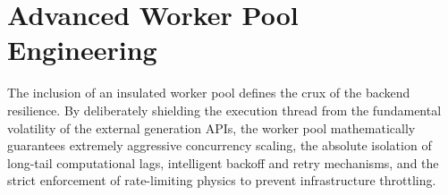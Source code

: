 \section{Advanced Worker Pool Engineering}
The inclusion of an insulated worker pool defines the crux of the backend resilience. By deliberately shielding the execution thread from the fundamental volatility of the external generation APIs, the worker pool mathematically guarantees extremely aggressive concurrency scaling, the absolute isolation of long-tail computational lags, intelligent backoff and retry mechanisms, and the strict enforcement of rate-limiting physics to prevent infrastructure throttling.
